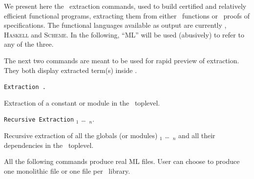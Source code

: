 \label{Extraction}

We present here the \Coq\ extraction commands, used to build certified
and relatively efficient functional programs, extracting them from
either \Coq\ functions or \Coq\ proofs of specifications. The
functional languages available as output are currently \ocaml{},
\textsc{Haskell} and \textsc{Scheme}.  In the following, ``ML'' will
be used (abusively) to refer to any of the three.



The next two commands are meant to be used for rapid preview of
extraction. They both display extracted term(s) inside \Coq.

\begin{description}
\item {\tt Extraction \qualid.} ~\par
  Extraction of a constant or module in the \Coq\ toplevel.

\item {\tt Recursive Extraction} \qualid$_1$ \dots\ \qualid$_n$. ~\par
  Recursive extraction of all the globals (or modules) \qualid$_1$ \dots\
  \qualid$_n$ and all their dependencies in the \Coq\ toplevel.
\end{description}


All the following commands produce real ML files. User can choose to produce
one monolithic file or one file per \Coq\ library. 

